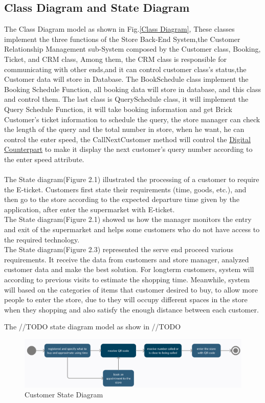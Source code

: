 \documentclass[a4paper,12pt]{book}
\begin{document}
\subsection{Class Diagram and State Diagram}
The Class Diagram model as shown in Fig.\ref{Class Diagram}, These classes implement the three functions of the Store Back-End System,the Customer Relationship Management sub-System composed by the  Customer class, Booking, Ticket, and CRM class, Among them, the CRM class is responsible for communicating with other ends,and it can control customer class's status,the Customer data will store in Database. The BookSchedule class implement the Booking Schedule Function, all booking data will store in database, and this class and control them. The last class is QuerySchedule class, it will implement the Query Schedule Function, it will take booking information and get Brick Customer's ticket information to schedule the query, the store manager can check the length of the query and the total number in store, when he want, he can control the enter speed, the CallNextCustomer method will control the \hyperref[Definitions]{Digital Counterpart} to make it display the next customer's query number according to the enter speed attribute.
\\
\\ The State diagram(Figure 2.1) illustrated the processing of a customer to require the E-ticket. Customers first state their requirements (time, goods, etc.), and then go to the store according to the expected departure time given by the application, after enter the supermarket with E-ticket.
\\ The State diagram(Figure 2.1) showed us how the manager monitors the entry and exit of the supermarket and helps some customers who do not have access to the required technology.
\\ The State diagram(Figure 2.3) represented the serve end proceed various requirements. It receive the data from customers and store manager, analyzed customer data and make the best solution. For longterm customers, system will according to previous visits to estimate the shopping time. Meanwhile, system will based on the categories of items that customer desired to buy, to allow more people to enter the store, due to they will occupy different spaces in the store when they shopping and also satisfy the enough distance between each customer.


The //TODO state diagram model as show in //TODO
\begin{figure} \label{State Diagram}
	\includegraphics[scale=0.3]{State_diagram1.png}
	\caption{Customer State Diagram}
	\centering
\end{figure}
\end{document}
